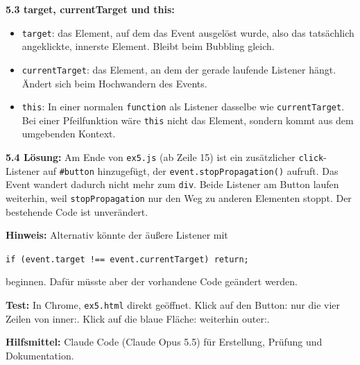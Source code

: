 \documentclass[11pt,a4paper]{article}
\begin{document}
\medskip
\textbf{5.3 target, currentTarget und this:}
\begin{itemize}
  \item \texttt{target}: das Element, auf dem das Event ausgelöst wurde,
    also das tatsächlich angeklickte, innerste Element. Bleibt beim
    Bubbling gleich.
  \item \texttt{currentTarget}: das Element, an dem der gerade laufende
    Listener hängt. Ändert sich beim Hochwandern des Events.
  \item \texttt{this}: In einer normalen \texttt{function} als Listener
    dasselbe wie \texttt{currentTarget}. Bei einer Pfeilfunktion wäre
    \texttt{this} nicht das Element, sondern kommt aus dem umgebenden
    Kontext.
\end{itemize}

\textbf{5.4 Lösung:} Am Ende von \texttt{ex5.js} (ab Zeile 15) ist ein
zusätzlicher \texttt{click}-Listener auf \texttt{\#button} hinzugefügt,
der \texttt{event.stopPropagation()} aufruft. Das Event wandert dadurch
nicht mehr zum \texttt{div}. Beide Listener am Button laufen weiterhin,
weil \texttt{stopPropagation} nur den Weg zu anderen Elementen stoppt.
Der bestehende Code ist unverändert.

\medskip
\textbf{Hinweis:} Alternativ könnte der äußere Listener mit
\begin{center}
\texttt{if (event.target !== event.currentTarget) return;}
\end{center}
beginnen. Dafür müsste aber der vorhandene Code geändert werden.

\medskip
\textbf{Test:} In Chrome, \texttt{ex5.html} direkt geöffnet.
Klick auf den Button: nur die vier Zeilen von \glqq inner:\grqq.
Klick auf die blaue Fläche: weiterhin \glqq outer:\grqq.

\medskip
{\small \textbf{Hilfsmittel:} Claude Code (Claude Opus 5.5) für Erstellung, Prüfung und Dokumentation.}
\end{document}
